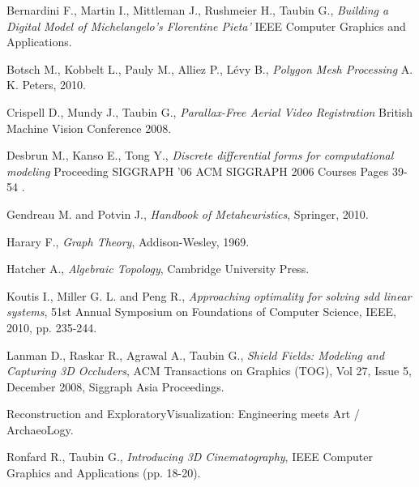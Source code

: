 \documentclass[conference,compsoc,a4paper]{IEEEtran}
\begin{document}
\begin{thebibliography}{1}

Bernardini F., Martin I., Mittleman J., Rushmeier H., Taubin G.,
\newblock \textit{Building a Digital Model of Michelangelo's Florentine Pieta'}
\newblock IEEE Computer Graphics and Applications.

Botsch M., Kobbelt L., Pauly M., Alliez P., Lévy B.,
\newblock \textit{Polygon Mesh Processing}
\newblock A. K. Peters, 2010.

Crispell D., Mundy J., Taubin G.,
\newblock \textit{Parallax-Free Aerial Video Registration}
\newblock British Machine Vision Conference 2008.

Desbrun M., Kanso E., Tong Y.,
\newblock \textit{Discrete differential forms for computational 
modeling}
\newblock Proceeding SIGGRAPH '06 ACM SIGGRAPH 2006 Courses Pages 
39-54 .
 
Gendreau M. and Potvin J., 
\newblock \textit{Handbook of Metaheuristics}, 
\newblock Springer, 2010.

Harary F., 
\newblock \textit{Graph Theory}, 
\newblock Addison-Wesley, 1969.

Hatcher A., 
\newblock \textit{Algebraic Topology}, 
\newblock Cambridge University Press.

Koutis I., Miller G. L. and Peng R., 
\newblock \textit{Approaching optimality for solving sdd linear systems}, 
\newblock 51st Annual Symposium on Foundations of Computer Science, IEEE, 
2010, pp. 235-244.

Lanman D., Raskar R., Agrawal A., Taubin G., 
\newblock \textit{Shield Fields: Modeling and Capturing 3D Occluders}, 
\newblock ACM Transactions on Graphics (TOG), Vol 27, Issue 5, December 
2008, Siggraph Asia Proceedings.

\newblock Reconstruction and ExploratoryVisualization: Engineering 
meets Art / ArchaeoLogy.

Ronfard R., Taubin G., 
\newblock \textit{Introducing 3D Cinematography}, 
\newblock IEEE Computer Graphics and Applications (pp. 18-20).


\end{thebibliography}
\end{document}
